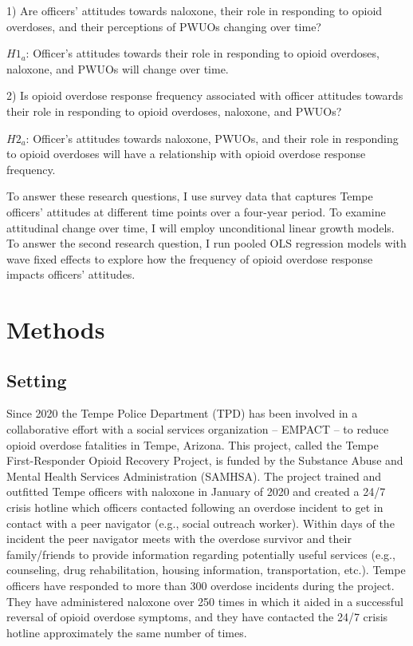 1) Are officers’ attitudes towards naloxone, their role in responding to opioid overdoses, and their perceptions of PWUOs changing over time? 

\begin{flushleft}
\(H1_a\): Officer's attitudes towards their role in responding to opioid overdoses, naloxone, and PWUOs will change over time.
\end{flushleft}

2) Is opioid overdose response frequency associated with officer attitudes towards their role in responding to opioid overdoses, naloxone, and PWUOs? 

\begin{flushleft}
\(H2_a\): Officer's attitudes towards naloxone, PWUOs, and their role in responding to opioid overdoses will have a relationship with opioid overdose response frequency.
\end{flushleft}

To answer these research questions, I use survey data that captures Tempe officers’ attitudes at different time points over a four-year period. To examine attitudinal change over time, I will employ unconditional linear growth models. To answer the second research question, I run pooled OLS regression models with wave fixed effects to explore how the frequency of opioid overdose response impacts officers’ attitudes.

\section{Methods}
\subsection{Setting}

Since 2020 the Tempe Police Department (TPD) has been involved in a collaborative effort with a social services organization – EMPACT – to reduce opioid overdose fatalities in Tempe, Arizona. This project, called the Tempe First-Responder Opioid Recovery Project, is funded by the Substance Abuse and Mental Health Services Administration (SAMHSA). The project trained and outfitted Tempe officers with naloxone in January of 2020 and created a 24/7 crisis hotline which officers contacted following an overdose incident to get in contact with a peer navigator (e.g., social outreach worker). Within days of the incident the peer navigator meets with the overdose survivor and their family/friends to provide information regarding potentially useful services (e.g., counseling, drug rehabilitation, housing information, transportation, etc.). Tempe officers have responded to more than 300 overdose incidents during the project. They have administered naloxone over 250 times in which it aided in a successful reversal of opioid overdose symptoms, and they have contacted the 24/7 crisis hotline approximately the same number of times. 


